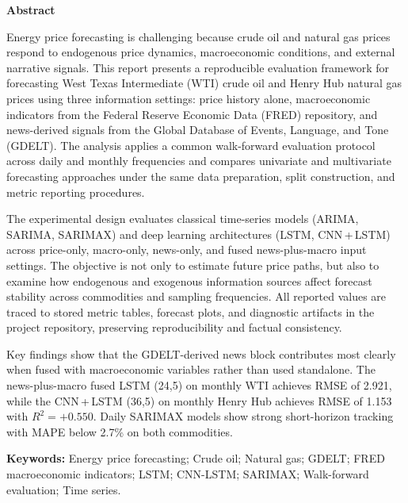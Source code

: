 \documentclass[12pt,a4paper]{article}
\begin{document}
\newpage
\begin{center}
  {\Large\bfseries\color{gwublue} Abstract}
\end{center}
\begin{mdframed}[backgroundcolor=lightblue,linecolor=gwublue,linewidth=1.5pt]
  \vspace{0.3em}
  Energy price forecasting is challenging because crude oil and natural gas prices respond to endogenous price dynamics, macroeconomic conditions, and external narrative signals. This report presents a reproducible evaluation framework for forecasting West Texas Intermediate (WTI) crude oil and Henry Hub natural gas prices using three information settings: price history alone, macroeconomic indicators from the Federal Reserve Economic Data (FRED) repository, and news-derived signals from the Global Database of Events, Language, and Tone (GDELT). The analysis applies a common walk-forward evaluation protocol across daily and monthly frequencies and compares univariate and multivariate forecasting approaches under the same data preparation, split construction, and metric reporting procedures.

  The experimental design evaluates classical time-series models (ARIMA, SARIMA, SARIMAX) and deep learning architectures (LSTM, CNN\,+\,LSTM) across price-only, macro-only, news-only, and fused news-plus-macro input settings. The objective is not only to estimate future price paths, but also to examine how endogenous and exogenous information sources affect forecast stability across commodities and sampling frequencies. All reported values are traced to stored metric tables, forecast plots, and diagnostic artifacts in the project repository, preserving reproducibility and factual consistency.

  Key findings show that the GDELT-derived news block contributes most clearly when fused with macroeconomic variables rather than used standalone. The news-plus-macro fused LSTM (24,5) on monthly WTI achieves RMSE of 2.921, while the CNN\,+\,LSTM (36,5) on monthly Henry Hub achieves RMSE of 1.153 with $R^2 = +0.550$. Daily SARIMAX models show strong short-horizon tracking with MAPE below 2.7\% on both commodities.
  \vspace{0.3em}
\end{mdframed}

\vspace{1em}
\noindent\textbf{Keywords:}
Energy price forecasting; Crude oil; Natural gas; GDELT; FRED macroeconomic indicators; LSTM; CNN-LSTM; SARIMAX; Walk-forward evaluation; Time series.
\end{document}
